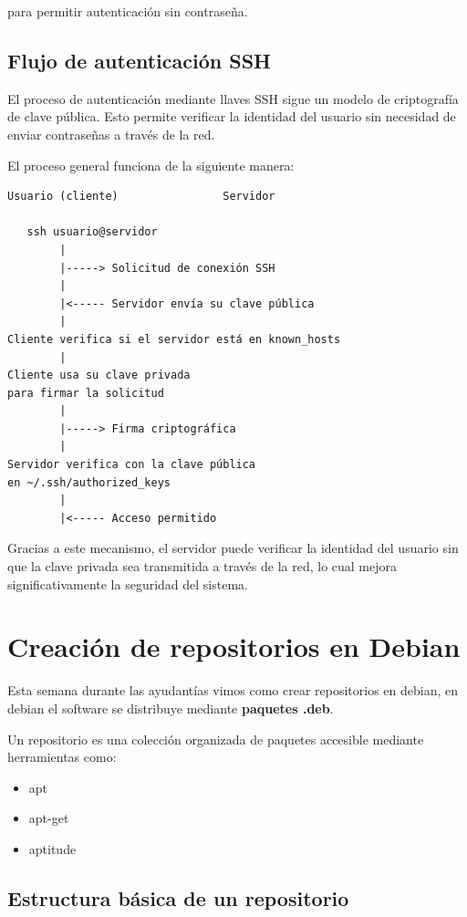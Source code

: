 \documentclass[11pt, letterpaper]{article}
\begin{document}
para permitir autenticación sin contraseña.
\subsection{Flujo de autenticación SSH}
\label{sec:org99eac07}

El proceso de autenticación mediante llaves SSH sigue un modelo de criptografía de clave pública. Esto permite verificar la identidad del usuario sin necesidad de enviar contraseñas a través de la red.

El proceso general funciona de la siguiente manera:

\begin{verbatim}
Usuario (cliente)                Servidor

   ssh usuario@servidor
        |
        |-----> Solicitud de conexión SSH
        |
        |<----- Servidor envía su clave pública
        |
Cliente verifica si el servidor está en known_hosts
        |
Cliente usa su clave privada
para firmar la solicitud
        |
        |-----> Firma criptográfica
        |
Servidor verifica con la clave pública
en ~/.ssh/authorized_keys
        |
        |<----- Acceso permitido
\end{verbatim}

Gracias a este mecanismo, el servidor puede verificar la identidad del usuario sin que la clave privada sea transmitida a través de la red, lo cual mejora significativamente la seguridad del sistema.
\section{Creación de repositorios en Debian}
\label{sec:org1c92da0}

Esta semana durante las ayudantías vimos como crear repositorios en debian, 
en debian el software se distribuye mediante \textbf{paquetes .deb}.

Un repositorio es una colección organizada de paquetes accesible mediante herramientas como:

\begin{itemize}
\item apt
\item apt-get
\item aptitude
\end{itemize}
\subsection{Estructura básica de un repositorio}
\label{sec:org98393ab}
\end{document}
